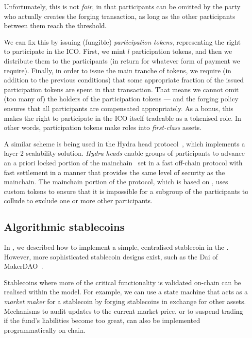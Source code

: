 Unfortunately, this is not \emph{fair}, in that participants can be omitted by the party who actually creates the forging transaction, as long as the other participants between them reach the threshold.

We can fix this by issuing (fungible) \emph{participation tokens}, representing the right to participate in the ICO.
First, we mint $l$ participation tokens, and then we distribute them to the participants (in return for whatever form of payment we require).
Finally, in order to issue the main tranche of tokens, we require (in addition to the previous conditions) that some appropriate fraction of the issued participation tokens are spent in that transaction.
That means we cannot omit (too many of) the holders of the participation tokens --- and the forging policy ensures that all participants are compensated appropriately.
As a bonus, this makes the right to participate in the ICO itself tradeable as a tokenised role. In other words, participation tokens make roles into \emph{first-class} assets.

A similar scheme is being used in the Hydra head protocol~\cite{chakravarty2020hydra}, which implements a layer-2 scalability solution. \emph{Hydra heads} enable groups of participants to advance an a priori locked portion of the mainchain \UTXO\ set in a fast off-chain protocol with fast settlement in a manner that provides the same level of security as the mainchain. The mainchain portion of the protocol, which is based on \EUTXOma, uses custom tokens to ensure that it is impossible for a subgroup of the participants to collude to exclude one or more other participants.

\subsection{Algorithmic stablecoins}
\label{sec:stablecoins}

In \cite{plain-multicurrency}, we described how to implement a simple, centralised stablecoin in the \UTXOma{}.
However, more sophisticated stablecoin designs exist, such as the Dai of MakerDAO~\cite{team2017dai}.

Stablecoins where more of the critical functionality is validated on-chain can be realised within the \EUTXOma{} model. For example, we can use a state machine that acts as a \emph{market maker} for a stablecoin by forging stablecoins in exchange for other assets. Mechanisms to audit updates to the current market price,  or to suspend trading if the fund's liabilities become too great, can also be implemented programmatically on-chain.
